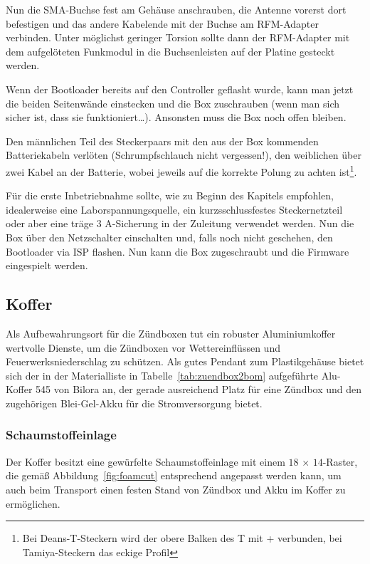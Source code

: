 \documentclass[paper=a4, parskip, numbers=noenddot, toc=listof, headsepline]{scrbook}
\begin{document}
					Nun die SMA-Buchse fest am Gehäuse anschrauben, die Antenne vorerst dort befestigen und das andere Kabelende mit der Buchse am RFM-Adapter verbinden. Unter möglichst geringer Torsion sollte dann der RFM-Adapter mit dem aufgelöteten Funkmodul in die Buchsenleisten auf der Platine gesteckt werden.

					Wenn der Bootloader bereits auf den Controller geflasht wurde, kann man jetzt die beiden Seitenwände einstecken und die Box zuschrauben (wenn man sich sicher ist, dass sie funktioniert\dots). Ansonsten muss die Box noch offen bleiben.

					Den männlichen Teil des Steckerpaars mit den aus der Box kommenden Batteriekabeln verlöten (Schrumpfschlauch nicht vergessen!), den weiblichen über zwei Kabel an der Batterie, wobei jeweils auf die korrekte Polung zu achten ist\footnote{Bei Deans-T-Steckern wird der obere Balken des T mit + verbunden, bei Tamiya-Steckern das eckige Profil}.

					Für die erste Inbetriebnahme sollte, wie zu Beginn des Kapitels empfohlen, idealerweise eine Laborspannungsquelle, ein kurzsschlussfestes Steckernetzteil oder aber eine träge 3 A-Sicherung in der Zuleitung verwendet werden. Nun die Box über den Netzschalter einschalten und, falls noch nicht geschehen, den Bootloader via ISP flashen. Nun kann die Box zugeschraubt und die
					Firmware eingespielt werden.

				\subsection{Koffer}

					Als Aufbewahrungsort für die Zündboxen tut ein robuster Aluminiumkoffer wertvolle Dienste, um die Zündboxen vor Wettereinflüssen und Feuerwerks\-nieder\-schlag zu schützen. Als gutes Pendant zum Plastikgehäuse bietet sich der in der Materialliste in Tabelle~\ref{tab:zuendbox2bom} aufgeführte Alu-Koffer 545 von Bilora an, der gerade ausreichend Platz für eine Zündbox und den zugehörigen Blei-Gel-Akku für die Stromversorgung bietet.

					\subsubsection{Schaumstoffeinlage}

						Der Koffer besitzt eine gewürfelte Schaumstoffeinlage mit einem $18\,\times\,14$-Raster, die gemäß Abbildung~\ref{fig:foamcut} entsprechend angepasst werden kann, um auch beim Transport einen festen Stand von Zündbox und Akku im Koffer zu ermöglichen.
\end{document}
